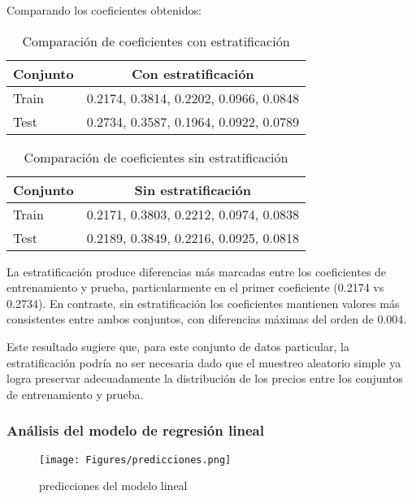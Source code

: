 \documentclass{tp02}
\begin{document}
Comparando los coeficientes obtenidos:
\begin{table}[h]
\centering
\begin{tabular}{|l|c|}
\hline
Conjunto & Con estratificación \\
\hline
Train & 0.2174, 0.3814, 0.2202, 0.0966, 0.0848 \\
Test & 0.2734, 0.3587, 0.1964, 0.0922, 0.0789 \\
\hline
\end{tabular}
\caption{Comparación de coeficientes con estratificación}
\label{tab:coef-estratificacion}
\end{table}

\begin{table}[h]
\centering
\begin{tabular}{|l|c|}
\hline
Conjunto & Sin estratificación \\
\hline
Train & 0.2171, 0.3803, 0.2212, 0.0974, 0.0838 \\
Test & 0.2189, 0.3849, 0.2216, 0.0925, 0.0818 \\
\hline
\end{tabular}
\caption{Comparación de coeficientes sin estratificación}
\label{tab:coef-sin-estratificacion}
\end{table}

La estratificación produce diferencias más marcadas entre los 
coeficientes de entrenamiento y prueba, particularmente en el primer 
coeficiente (0.2174 vs 0.2734). En contraste, sin estratificación los 
coeficientes mantienen valores más consistentes entre ambos conjuntos, 
con diferencias máximas del orden de 0.004.

Este resultado sugiere que, para este conjunto de datos particular, la 
estratificación podría no ser necesaria dado que el muestreo aleatorio 
simple ya logra preservar adecuadamente la distribución de los precios 
entre los conjuntos de entrenamiento y prueba.

\subsubsection{Análisis del modelo de regresión lineal}


\begin{figure}[H]
    \centering
    \texttt{[image: Figures/predicciones.png]}
    \caption{predicciones del modelo lineal}
    \label{fig:predicciones}
    \end{figure}
\end{document}
